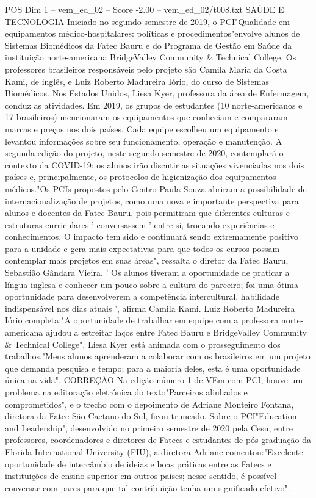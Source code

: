 \begin{textsample}{POS Dim 1 – vem\_ed\_02 – Score -2.00 – vem\_ed\_02/t008.txt}  \label{ex:f1_pos_077}
SAÚDE E TECNOLOGIA Iniciado no segundo semestre de 2019, o PCI"Qualidade em equipamentos médico-hospitalares: políticas e procedimentos"envolve alunos de Sistemas Biomédicos da Fatec Bauru e do Programa de Gestão em Saúde da instituição norte-americana BridgeValley Community \& Technical College.
Os professores brasileiros responsáveis pelo projeto são Camila Maria da Costa Kami, de inglês, e Luiz Roberto Madureira Iório, do curso de Sistemas Biomédicos.
Nos Estados Unidos, Liesa Kyer, professora da área de Enfermagem, conduz as atividades.
Em 2019, os grupos de estudantes (10 norte-americanos e 17 brasileiros) mencionaram os equipamentos que conheciam e compararam marcas e preços nos dois países.
Cada equipe escolheu um equipamento e levantou informações sobre seu funcionamento, operação e manutenção.
A segunda edição do projeto, neste segundo semestre de 2020, contemplará o contexto da COVID-19: os alunos irão discutir as situações vivenciadas nos dois países e, principalmente, os protocolos de higienização dos equipamentos médicos."Os PCIs propostos pelo Centro Paula Souza abriram a possibilidade de internacionalização de projetos, como uma nova e importante perspectiva para alunos e docentes da Fatec Bauru, pois permitiram que diferentes culturas e estruturas curriculares ' conversassem ' entre si, trocando experiências e conhecimentos.
O impacto tem sido e continuará sendo extremamente positivo para a unidade e gera mais expectativas para que todos os cursos possam contemplar mais projetos em suas áreas", ressalta o diretor da Fatec Bauru, Sebastião Gândara Vieira. ' Os alunos tiveram a oportunidade de praticar a língua inglesa e conhecer um pouco sobre a cultura do parceiro; foi uma ótima oportunidade para desenvolverem a competência intercultural, habilidade indispensável nos dias atuais ', afirma Camila Kami.
Luiz Roberto Madureira Iório completa:"A oportunidade de trabalhar em equipe com a professora norte-americana ajudou a estreitar laços entre Fatec Bauru e BridgeValley Community \& Technical College".
Liesa Kyer está animada com o prosseguimento dos trabalhos."Meus alunos aprenderam a colaborar com os brasileiros em um projeto que demanda pesquisa e tempo; para a maioria deles, esta é uma oportunidade única na vida".
CORREÇÃO Na edição número 1 de VEm com PCI, houve um problema na editoração eletrônica do texto"Parceiros alinhados e comprometidos", e o trecho com o depoimento de Adriane Monteiro Fontana, diretora da Fatec São Caetano do Sul, ficou truncado.
Sobre o PCI"Education and Leadership", desenvolvido no primeiro semestre de 2020 pela Cesu, entre professores, coordenadores e diretores de Fatecs e estudantes de pós-graduação da Florida International University (FIU), a diretora Adriane comentou:"Excelente oportunidade de intercâmbio de ideias e boas práticas entre as Fatecs e instituições de ensino superior em outros países; nesse sentido, é possível conversar com pares para que tal contribuição tenha um significado efetivo".

\end{textsample}
